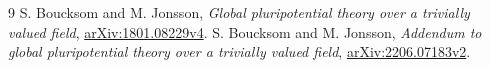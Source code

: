 \documentclass[10pt]{article}
\begin{document}
\begin{thebibliography}{9}
 S. Boucksom and M. Jonsson,
\emph{Global pluripotential theory over a trivially valued field},
\href{https://arxiv.org/pdf/1801.08229v4}{arXiv:1801.08229v4}.
 S. Boucksom and M. Jonsson,
\emph{Addendum to global pluripotential theory over a trivially valued field},
\href{https://arxiv.org/pdf/2206.07183v2}{arXiv:2206.07183v2}.
\end{thebibliography}
\end{document}
